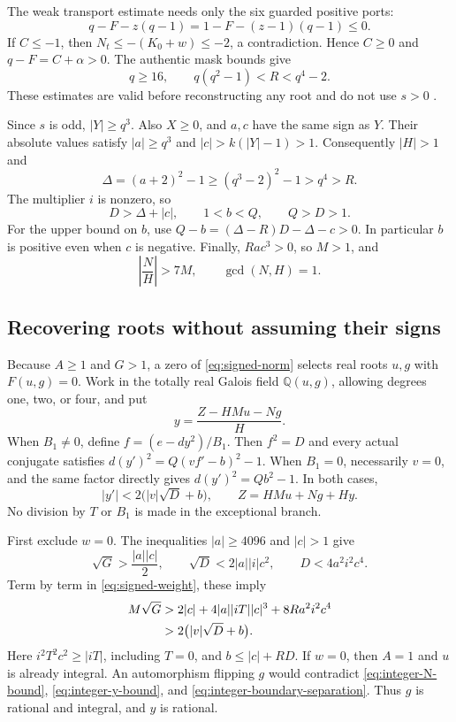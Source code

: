 \documentclass[11pt,letterpaper]{article}
\theoremstyle{remark}
\begin{document}
The weak transport estimate needs only the six guarded positive ports:
\[
 q-F-z(q-1)=1-F-(z-1)(q-1)\leq0.
\]
If $C\leq-1$, then $N_t\leq-(K_0+w)\leq-2$, a contradiction.
Hence $C\geq0$ and $q-F=C+\alpha>0$. The authentic mask bounds give
\begin{equation}\label{eq:integer-mask-bound}
 q\geq16,\qquad q(q^2-1)<R<q^4-2.
\end{equation}
These estimates are valid before reconstructing any root and do not use
$s>0$ \cite{normalized,repo19}.

Since $s$ is odd, $|Y|\geq q^3$. Also $X\geq0$, and $a,c$ have
the same sign as $Y$. Their absolute values satisfy
$|a|\geq q^3$ and $|c|>k(|Y|-1)>1$. Consequently $|H|>1$ and
\[
 \Delta=(a+2)^2-1\geq(q^3-2)^2-1>q^4>R.
\]
The multiplier $i$ is nonzero, so
\begin{equation}\label{eq:integer-pre-root}
 D>\Delta+|c|,\qquad 1<b<Q,\qquad Q>D>1.
\end{equation}
For the upper bound on $b$, use
$Q-b=(\Delta-R)D-\Delta-c>0$. In particular $b$ is positive even
when $c$ is negative. Finally, $Ra c^3>0$, so $M>1$, and
\begin{equation}\label{eq:integer-N-bound}
 \left|\frac NH\right|>7M,\qquad \gcd(N,H)=1.
\end{equation}

\subsection{Recovering roots without assuming their signs}

Because $A\geq1$ and $G>1$, a zero of \eqref{eq:signed-norm}
selects real roots $u,g$ with $F(u,g)=0$. Work in the totally real
Galois field $\mathbb Q(u,g)$, allowing degrees one, two, or four, and put
\[
 y=\frac{Z-HMu-Ng}{H}.
\]
When $B_1\ne0$, define $f=(e-dy^2)/B_1$. Then $f^2=D$ and every
actual conjugate satisfies
$d(y')^2=Q(vf'-b)^2-1$. When $B_1=0$, necessarily $v=0$, and the
same factor directly gives $d(y')^2=Qb^2-1$. In both cases,
\begin{equation}\label{eq:integer-y-bound}
 |y'|<2\bigl(|v|\sqrt D+b\bigr),\qquad
 Z=HMu+Ng+Hy.
\end{equation}
No division by $T$ or $B_1$ is made in the exceptional branch.

First exclude $w=0$. The inequalities $|a|\geq4096$ and $|c|>1$ give
\[
 \sqrt G>\frac{|a||c|}{2},\qquad
 \sqrt D<2|a||i|c^2,\qquad D<4a^2i^2c^4.
\]
Term by term in \eqref{eq:signed-weight}, these imply
\begin{align}
 M\sqrt G
 &>2|c|+4|a||iT||c|^3+8Ra^2i^2c^4\notag\\
 &>2\bigl(|v|\sqrt D+b\bigr).
 \label{eq:integer-boundary-separation}
\end{align}
Here $i^2T^2c^2\geq|iT|$, including $T=0$, and
$b\leq|c|+RD$. If $w=0$, then $A=1$ and $u$ is already integral.
An automorphism flipping $g$ would contradict
\eqref{eq:integer-N-bound}, \eqref{eq:integer-y-bound}, and
\eqref{eq:integer-boundary-separation}. Thus $g$ is rational and
integral, and $y$ is rational.
\end{document}
